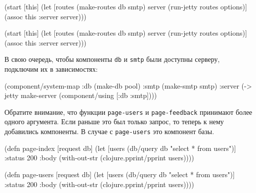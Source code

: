 \ifx\DEVICETYPE\MOBILE

\begin{english}
  \begin{clojure}
(start [this]
  (let [routes (make-routes db smtp)
        server (run-jetty
                 routes options)]
    (assoc this :server server)))
  \end{clojure}
\end{english}

\else

\begin{english}
  \begin{clojure}
(start [this]
  (let [routes (make-routes db smtp)
        server (run-jetty routes options)]
    (assoc this :server server)))
  \end{clojure}
\end{english}

\fi

В свою очередь, чтобы компоненты \verb|db| и \verb|smtp| были доступны серверу,
подключим их в зависимостях:

\begin{english}
  \begin{clojure}
(component/system-map
 :db   (make-db pool)
 :smtp (make-smtp smtp)
 :server
 (-> jetty
     make-server
     (component/using [:db :smtp])))
  \end{clojure}
\end{english}

Обратите внимание, что функции \verb|page-users| и \verb|page-feedback|
принимают более одного аргумента. Если раньше это был только запрос, то теперь к
нему добавились компоненты. В случае с \verb|page-users| это компонент базы.

\ifx\DEVICETYPE\MOBILE

\begin{english}
  \begin{clojure}
(defn page-index
  [request db]
  (let [users (db/query db
                "select * from users")]
    {:status 200
     :body (with-out-str
             (clojure.pprint/pprint
               users))}))
  \end{clojure}
\end{english}

\else

\begin{english}
  \begin{clojure}
(defn page-users
  [request db]
  (let [users (db/query db "select * from users")]
    {:status 200
     :body (with-out-str
             (clojure.pprint/pprint users))}))
  \end{clojure}
\end{english}

